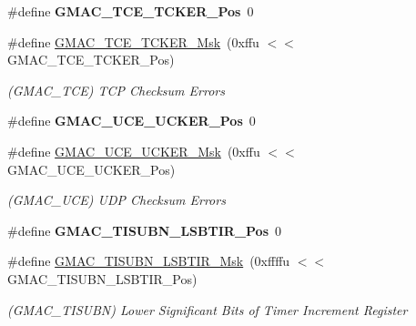 \begin{DoxyCompactItemize}
\mbox{\label{group__SAMV71__GMAC_ga159c1804b839f8c02777c1ca0f089248}} 
\#define {\bfseries G\+M\+A\+C\+\_\+\+T\+C\+E\+\_\+\+T\+C\+K\+E\+R\+\_\+\+Pos}~0
\item 
\mbox{\label{group__SAMV71__GMAC_ga9a9d8ec67e55792a0e1eb61e646c6e78}} 
\#define \mbox{\hyperlink{group__SAMV71__GMAC_ga9a9d8ec67e55792a0e1eb61e646c6e78}{G\+M\+A\+C\+\_\+\+T\+C\+E\+\_\+\+T\+C\+K\+E\+R\+\_\+\+Msk}}~(0xffu $<$$<$ G\+M\+A\+C\+\_\+\+T\+C\+E\+\_\+\+T\+C\+K\+E\+R\+\_\+\+Pos)
\begin{DoxyCompactList}\small\item\em (G\+M\+A\+C\+\_\+\+T\+CE) T\+CP Checksum Errors \end{DoxyCompactList}\item 
\mbox{\label{group__SAMV71__GMAC_gac4209252f7d9ef9dd5d875e491fa74d1}} 
\#define {\bfseries G\+M\+A\+C\+\_\+\+U\+C\+E\+\_\+\+U\+C\+K\+E\+R\+\_\+\+Pos}~0
\item 
\mbox{\label{group__SAMV71__GMAC_gab8ae6e85098b4c15b2ee11189e42c415}} 
\#define \mbox{\hyperlink{group__SAMV71__GMAC_gab8ae6e85098b4c15b2ee11189e42c415}{G\+M\+A\+C\+\_\+\+U\+C\+E\+\_\+\+U\+C\+K\+E\+R\+\_\+\+Msk}}~(0xffu $<$$<$ G\+M\+A\+C\+\_\+\+U\+C\+E\+\_\+\+U\+C\+K\+E\+R\+\_\+\+Pos)
\begin{DoxyCompactList}\small\item\em (G\+M\+A\+C\+\_\+\+U\+CE) U\+DP Checksum Errors \end{DoxyCompactList}\item 
\mbox{\label{group__SAMV71__GMAC_gadbab2193d402a31a9a0c51f4bac168f3}} 
\#define {\bfseries G\+M\+A\+C\+\_\+\+T\+I\+S\+U\+B\+N\+\_\+\+L\+S\+B\+T\+I\+R\+\_\+\+Pos}~0
\item 
\mbox{\label{group__SAMV71__GMAC_ga13bc69fe3e9340ed8278e723a1637ec0}} 
\#define \mbox{\hyperlink{group__SAMV71__GMAC_ga13bc69fe3e9340ed8278e723a1637ec0}{G\+M\+A\+C\+\_\+\+T\+I\+S\+U\+B\+N\+\_\+\+L\+S\+B\+T\+I\+R\+\_\+\+Msk}}~(0xffffu $<$$<$ G\+M\+A\+C\+\_\+\+T\+I\+S\+U\+B\+N\+\_\+\+L\+S\+B\+T\+I\+R\+\_\+\+Pos)
\begin{DoxyCompactList}\small\item\em (G\+M\+A\+C\+\_\+\+T\+I\+S\+U\+BN) Lower Significant Bits of Timer Increment Register \end{DoxyCompactList}\item 
$$
\end{DoxyCompactItemize}
